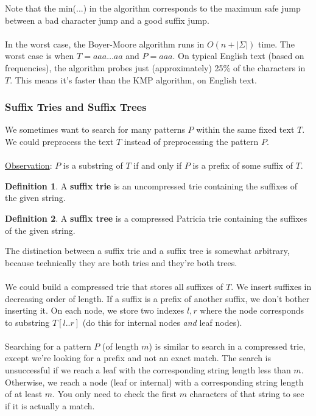 \documentclass[]{article}
\theoremstyle{definition}
\newtheorem*{defn}{Definition}
\begin{document}
				Note that the min(...) in the algorithm corresponds to the maximum safe jump between a bad character jump and a good suffix jump.
				\\ \\
				In the worst case, the Boyer-Moore algorithm runs in $O(n + |\Sigma|)$ time. The worst case is when $T = aaa \ldots aa$ and $P = aaa$. On typical English text (based on frequencies), the algorithm probes just (approximately) 25\% of the characters in $T$. This means it's faster than the KMP algorithm, on English text.

			\subsubsection{Suffix Tries and Suffix Trees}
				We sometimes want to search for many patterns $P$ within the same fixed text $T$. We could preprocess the text $T$ instead of preprocessing the pattern $P$.
				\\ \\
				\underline{Observation}: $P$ is a substring of $T$ if and only if $P$ is a prefix of some suffix of $T$.
				
				\begin{defn}
					A \textbf{suffix trie} is an uncompressed trie containing the suffixes of the given string.
				\end{defn}
				
				\begin{defn}
					A \textbf{suffix tree} is a compressed Patricia trie containing the suffixes of the given string.
				\end{defn}
				
				The distinction between a suffix trie and a suffix tree is somewhat arbitrary, because technically they are both tries and they're both trees.
				\\ \\
				We could build a compressed trie that stores all suffixes of $T$. We insert suffixes in decreasing order of length. If a suffix is a prefix of another suffix, we don't bother inserting it. On each node, we store two indexes $l, r$ where the node corresponds to substring $T[l..r]$ (do this for internal nodes \emph{and} leaf nodes).
				\\ \\
				Searching for a pattern $P$ (of length $m$) is similar to search in a compressed trie, except we're looking for a prefix and not an exact match. The search is unsuccessful if we reach a leaf with the corresponding string length less than $m$. Otherwise, we reach a node (leaf or internal) with a corresponding string length of at least $m$. You only need to check the first $m$ characters of that string to see if it is actually a match.
\end{document}
